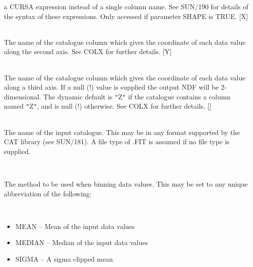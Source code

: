 \documentclass[twoside,11pt]{article}
\renewcommand{\_}{\texttt{\symbol{95}}}
\newcommand{\sstsubsection}[1]{ \item[{#1}] \mbox{} \\}
\newcommand{\sstitemlist}[1]{
  \mbox{} \\
  \vspace{-3.5ex}
  \begin{itemize}
     #1
  \end{itemize}
}
\newcommand{\sstitem}{\item}
\newcommand{\sstsubsection}[1]{\item[{#1}]}
\newcommand{\sstitemlist}[1]{
      \begin{itemize}
         #1
      \end{itemize}
      \\
   }
\newcommand{\sstitem}{\item}
\begin{document}
{{{         a CURSA expression instead of a single column name. See SUN/190 for
         details of the syntax of these expressions. Only accessed if
         parameter SHAPE is TRUE. [X]
      }
      \sstsubsection{
         COLY = LITERAL (Read)
      }{
         The name of the catalogue column which gives the coordinate
         of each data value along the second axis. See COLX for further
         details. [Y]
      }
      \sstsubsection{
         COLZ = LITERAL (Read)
      }{
         The name of the catalogue column which gives the coordinate
         of each data value along a third axis. If a null (!) value is
         supplied the output NDF will be 2-dimensional. The dynamic default
         is {\tt "}Z{\tt "} if the catalogue contains a column named {\tt "}Z{\tt "}, and is null
         (!) otherwise. See COLX for further details. []
      }
      \sstsubsection{
         IN = LITERAL (Read)
      }{
         The name of the input catalogue. This may be in any format
         supported by the CAT library (see SUN/181). A file type of .FIT
         is assumed if no file type is supplied.
      }
      \sstsubsection{
         METHOD = LITERAL (Read)
      }{
         The method to be used when binning data values. This may be
         set to any unique abbreviation of the following:

         \sstitemlist{

            \sstitem
               MEAN      -- Mean of the input data values

            \sstitem
               MEDIAN    -- Median of the input data values

            \sstitem
               SIGMA     -- A sigma clipped mean

}}}}
\end{document}
